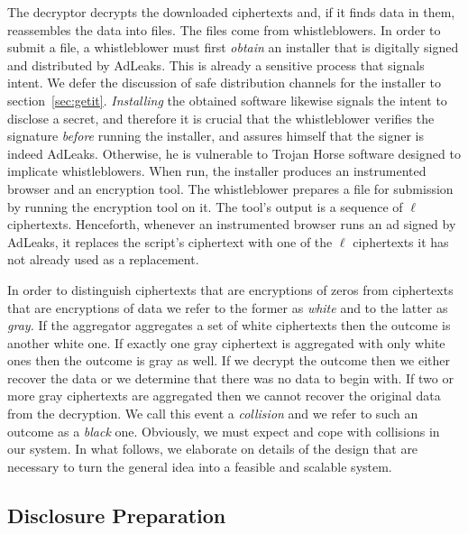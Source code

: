 \documentclass[twocolumn,10pt]{article}
\begin{document}
The decryptor decrypts the downloaded ciphertexts and, if it finds data in
them, reassembles the data into files. The files come from whistleblowers.
In order to submit a file, a whistleblower must first \emph{obtain} an
installer that is digitally signed and distributed by AdLeaks.  This is
already a sensitive process that signals intent.  We defer the discussion of
safe distribution channels for the installer to section~\ref{sec:getit}.
\emph{Installing} the obtained software likewise signals the intent to
disclose a secret, and therefore it is crucial that the whistleblower
verifies the signature \emph{before} running the installer, and assures
himself that the signer is indeed AdLeaks.  Otherwise, he is vulnerable to
Trojan Horse software designed to implicate whistleblowers.  When run, the
installer produces an instrumented browser and an encryption tool.  The
whistleblower prepares a file for submission by running the encryption tool
on it.  The tool's output is a sequence of $\ell$ ciphertexts.  Henceforth,
whenever an instrumented browser runs an ad signed by AdLeaks, it replaces
the script's ciphertext with one of the $\ell$ ciphertexts it has not
already used as a replacement.

In order to distinguish ciphertexts that are encryptions of zeros from
ciphertexts that are encryptions of data we refer to the former as
\emph{white} and to the latter as \emph{gray.}  If the aggregator aggregates
a set of white ciphertexts then the outcome is another white one.  If
exactly one gray ciphertext is aggregated with only white ones then the
outcome is gray as well.  If we decrypt the outcome then we either recover
the data or we determine that there was no data to begin with.  If two or
more gray ciphertexts are aggregated then we cannot recover the original
data from the decryption.  We call this event a \emph{collision} and we
refer to such an outcome as a \emph{black} one.  Obviously, we must expect
and cope with collisions in our system.  In what follows, we elaborate on
details of the design that are necessary to turn the general idea into a
feasible and scalable system.


\subsection{Disclosure Preparation}
\label{sec:prep}
\end{document}
